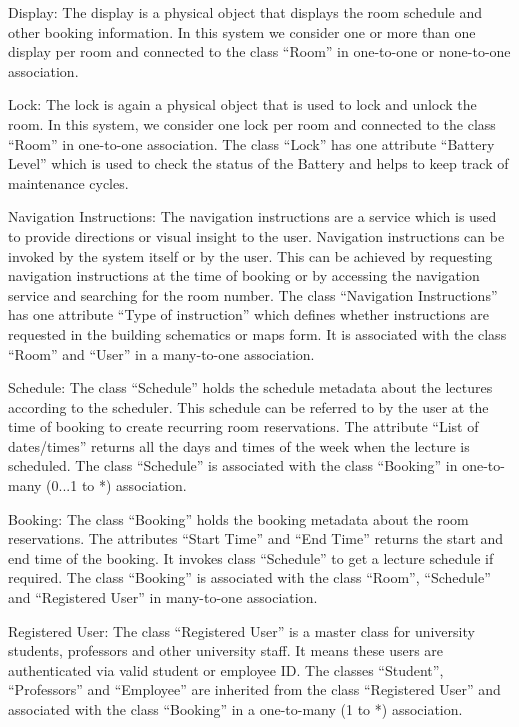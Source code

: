 \documentclass[conference,onecolumn]{IEEEtran}
\begin{document}
		Display: The display is a physical object that displays the room schedule and other booking information. In this system we consider one or more than one display per room and connected to the class ``Room'' in one-to-one or none-to-one association.

		Lock: The lock is again a physical object that is used to lock and unlock the room. In this system, we consider one lock per room and connected to the class ``Room'' in one-to-one association. The class ``Lock'' has one attribute ``Battery Level'' which is used to check the status of the Battery and helps to keep track of maintenance cycles.

		Navigation Instructions: The navigation instructions are a service which is used to provide directions or visual insight to the user. Navigation instructions can be invoked by the system itself or by the user. This can be achieved by requesting navigation instructions at the time of booking or by accessing the navigation service and searching for the room number. The class ``Navigation Instructions'' has one attribute ``Type of instruction'' which defines whether instructions are requested in the building schematics or maps form. It is associated with the class ``Room'' and ``User'' in a many-to-one association.

		Schedule: The class ``Schedule'' holds the schedule metadata about the lectures according to the scheduler. This schedule can be referred to by the user at the time of booking to create recurring room reservations. The attribute ``List of dates/times'' returns all the days and times of the week when the lecture is scheduled. The class ``Schedule'' is associated with the class ``Booking'' in one-to-many (0...1 to *) association.

		Booking: The class ``Booking'' holds the booking metadata about the room reservations. The attributes ``Start Time'' and ``End Time'' returns the start and end time of the booking. It invokes class ``Schedule'' to get a lecture schedule if required. The class ``Booking'' is associated with the class ``Room'', ``Schedule'' and ``Registered User'' in many-to-one association.

		Registered User: The class ``Registered User'' is a master class for university students, professors and other university staff. It means these users are authenticated via valid student or employee ID. The classes ``Student'', ``Professors'' and ``Employee'' are inherited from the class ``Registered User'' and associated with the class ``Booking'' in a one-to-many (1 to *) association.
\end{document}
